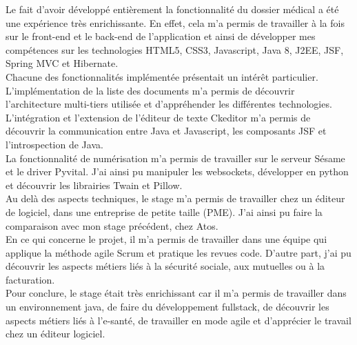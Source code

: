 Le fait d'avoir développé entièrement la fonctionnalité du dossier médical a été une expérience très enrichissante. En effet, cela m'a permis de travailler à la fois sur le front-end et le back-end de l'application et ainsi de développer mes compétences sur les technologies HTML5, CSS3, Javascript, Java 8, J2EE, JSF, Spring MVC et Hibernate. \\
Chacune des fonctionnalités implémentée présentait un intérêt particulier.\\
L'implémentation de la liste des documents m'a permis de découvrir l'architecture multi-tiers utilisée et d'appréhender les différentes technologies.\\ L'intégration et l'extension de l'éditeur de texte Ckeditor m'a permis de découvrir la communication entre Java et Javascript, les composants JSF et l'introspection de Java.\\
La fonctionnalité de numérisation m'a permis de travailler sur le serveur Sésame et le driver Pyvital. J'ai ainsi pu manipuler les websockets, développer en python et découvrir les librairies Twain et Pillow.\\

Au delà des aspects techniques, le stage m'a permis de travailler chez un éditeur de logiciel, dans une entreprise de petite taille (PME). J'ai ainsi pu faire la comparaison avec mon stage précédent, chez Atos.\\
En ce qui concerne le projet, il m'a permis de travailler dans une équipe qui applique la méthode agile Scrum et pratique les revues code. D'autre part, j'ai pu découvrir les aspects métiers liés à la sécurité sociale, aux mutuelles ou à la facturation.\\

Pour conclure, le stage était très enrichissant car il m'a permis de travailler dans un environnement java, de faire du développement fullstack, de découvrir les aspects métiers liés à l'e-santé, de travailler en mode agile et d'apprécier le travail chez un éditeur logiciel.



